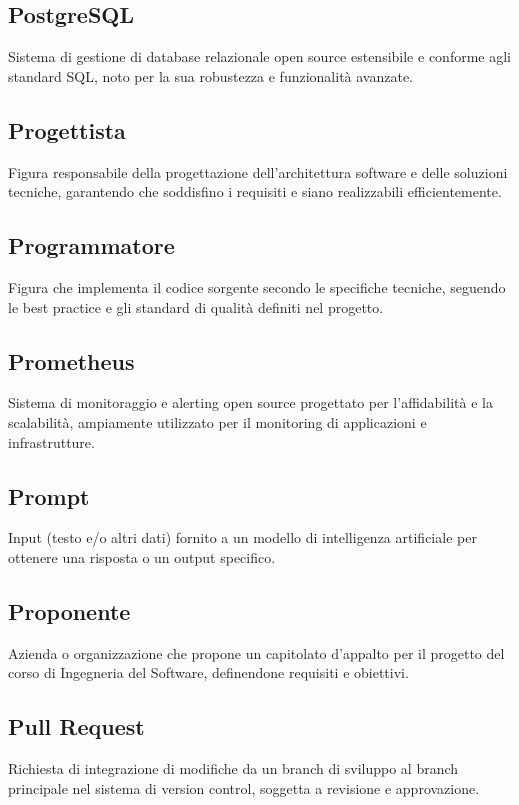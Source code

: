 \documentclass[a4paper,11pt]{article}
\begin{document}
\subsection{PostgreSQL}
Sistema di gestione di database relazionale open source estensibile e conforme agli standard SQL, noto per la sua robustezza e funzionalità avanzate.

\subsection{Progettista}
Figura responsabile della progettazione dell'architettura software e delle soluzioni tecniche, garantendo che soddisfino i requisiti e siano realizzabili efficientemente.

\subsection{Programmatore}
Figura che implementa il codice sorgente secondo le specifiche tecniche, seguendo le best practice e gli standard di qualità definiti nel progetto.

\subsection{Prometheus}
Sistema di monitoraggio e alerting open source progettato per l'affidabilità e la scalabilità, ampiamente utilizzato per il monitoring di applicazioni e infrastrutture.

\subsection{Prompt}
Input (testo e/o altri dati) fornito a un modello di intelligenza artificiale per ottenere una risposta o un output specifico.

\subsection{Proponente}
Azienda o organizzazione che propone un capitolato d'appalto per il progetto del corso di Ingegneria del Software, definendone requisiti e obiettivi.

\subsection{Pull Request}
Richiesta di integrazione di modifiche da un branch di sviluppo al branch principale nel sistema di version control, soggetta a revisione e approvazione.
\end{document}

